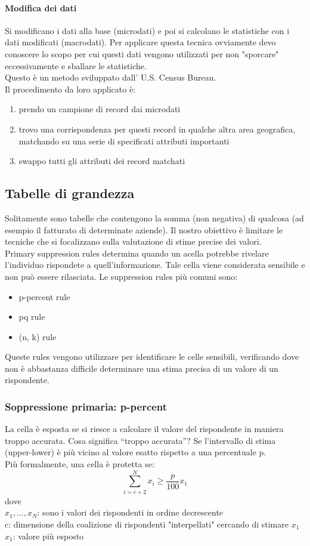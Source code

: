 \paragraph{Modifica dei dati}
Si modificano i dati alla base (microdati) e poi si calcolano le statistiche con i dati modificati (macrodati). Per applicare questa tecnica ovviamente devo conoscere lo scopo per cui questi dati vengono utilizzati per non "sporcare" eccessivamente e sballare le statistiche.\\
Questo è un metodo sviluppato dall' U.S. Census Bureau.\\
Il procedimento da loro applicato è:
\begin{enumerate}
    \item prendo un campione di record dai microdati
    \item trovo una corrispondenza per questi record in qualche altra area geografica, matchando su una serie di specificati attributi importanti
    \item swappo tutti gli attributi dei record matchati 
\end{enumerate}

\subsection{Tabelle di grandezza}
Solitamente sono tabelle che contengono la somma (non negativa) di qualcosa (ad esempio il fatturato di determinate aziende). Il nostro obiettivo è limitare le tecniche che si focalizzano sulla valutazione di stime precise dei valori.\\
Primary suppression rules determina quando un acella potrebbe rivelare l'individuo rispondete a quell'informazione. Tale cella viene considerata sensibile e non può essere rilasciata. Le suppression rules più comuni sono:
\begin{itemize}
    \item p-percent rule
    \item pq rule
    \item (n, k) rule
\end{itemize}
Queste rules vengono utilizzare per identificare le celle sensibili, verificando dove non è abbastanza difficile determinare una stima precisa di un valore di un rispondente.

\subsubsection{Soppressione primaria: p-percent}
La cella è esposta se si riesce a calcolare il valore del rispondente in maniera troppo accurata. Cosa significa “troppo accurata”? Se l’intervallo di stima (upper-lower) è più vicino al valore esatto rispetto a una percentuale p.\\
Più formalmente, una cella è protetta se:
\[\sum_{i=c+2}^N x_i \geq \frac{p}{100}x_1\]
dove\\ 
\(x_1,...,x_N\): sono i valori dei rispondenti in ordine decrescente \\
c: dimensione della coalizione di rispondenti "interpellati" cercando di stimare \(x_1\) \\
\(x_1\): valore più esposto \\

